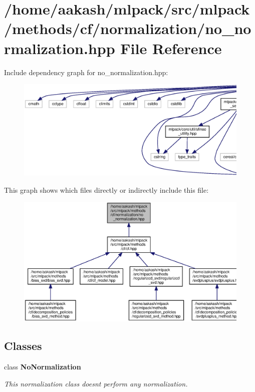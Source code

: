 \section{/home/aakash/mlpack/src/mlpack/methods/cf/normalization/no\+\_\+normalization.hpp File Reference}
\label{no__normalization_8hpp}
Include dependency graph for no\+\_\+normalization.\+hpp\+:
\nopagebreak
\begin{figure}[H]
\begin{center}
\leavevmode
\includegraphics[width=350pt]{no__normalization_8hpp__incl}
\end{center}
\end{figure}
This graph shows which files directly or indirectly include this file\+:
\nopagebreak
\begin{figure}[H]
\begin{center}
\leavevmode
\includegraphics[width=350pt]{no__normalization_8hpp__dep__incl}
\end{center}
\end{figure}
\subsection*{Classes}
\begin{DoxyCompactItemize}
\item 
class \textbf{ No\+Normalization}
\begin{DoxyCompactList}\small\item\em This normalization class doesn\textquotesingle{}t perform any normalization. \end{DoxyCompactList}\end{DoxyCompactItemize}
